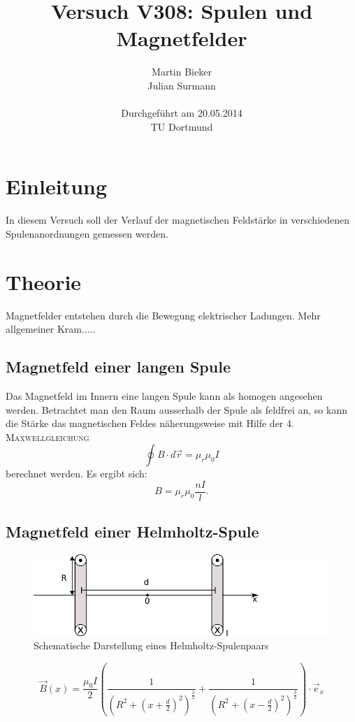\documentclass[11pt,ngerman,a4paper]{article}
\title{\textbf{Versuch V308: Spulen und Magnetfelder}}
\author{Martin Bieker\\
		Julian Surmann\\
		\\
		Durchgef\"{u}hrt am 20.05.2014\\
		TU Dortmund}
\date{}
\begin{document}
\renewcommand\tablename{Tabelle}
\renewcommand\figurename{Abbildung}
\maketitle
\thispagestyle{empty}
\newpage
\clearpage
\setcounter{page}{1}


\section{Einleitung}
In diesem Versuch soll der Verlauf der magnetischen Feldstärke in verschiedenen Spulenanordnungen gemessen werden. 
\section{Theorie}
Magnetfelder entstehen durch die Bewegung elektrischer Ladungen. Mehr allgemeiner Kram.....

\subsection{Magnetfeld einer langen Spule}
Das Magnetfeld im Innern eine langen Spule kann als homogen angesehen werden. Betrachtet man den Raum ausserhalb der Spule als feldfrei an, so kann die Stärke das magnetischen Feldes näherungsweise mit Hilfe der \textsc{4. Maxwellgleichung} 
\begin{equation}
\oint B\cdot d\vec r = \mu_r\mu_0 I
\end{equation}
berechnet werden. Es ergibt sich:
\
\begin{equation}
B = \mu_r\mu_0\frac{nI}l\mathrm.
\end{equation}
\subsection{Magnetfeld einer Helmholtz-Spule}

\begin{figure}[htp]
\centering
\includegraphics[scale=1.00]{helmholtz.png}
\caption{Schematische Darstellung eines Helmholtz-Spulenpaars}
\label{}
\end{figure}
\begin{equation}
\vec B(x)= \frac{\mu_0I}{2}\left(\frac1{\left(R^2 + (x+\frac d2)^2 \right)^\frac32} + \frac1{\left(R^2 + (x-\frac d2)^2 \right)^\frac32}  \right) \cdot \vec e_x
\end{equation}
\end{document}
